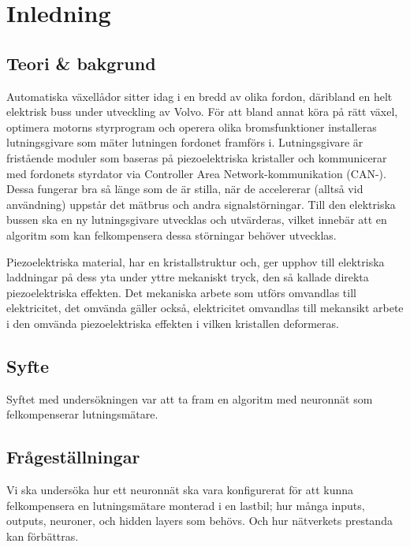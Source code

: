 \section{Inledning}
\subsection{Teori \& bakgrund}

Automatiska växellådor sitter idag i en bredd av olika fordon, däribland en
helt elektrisk buss under utveckling av Volvo.
För att bland annat köra på rätt växel, optimera motorns styrprogram och operera
olika bromsfunktioner %
installeras lutningsgivare som mäter lutningen fordonet framförs i.
Lutningsgivare är fristående moduler som baseras på piezoelektriska
kristaller och kommunicerar med fordonets styrdator via Controller
Area Network-kommunikation (CAN-).
Dessa fungerar bra så länge som de är stilla, när de accelererar (alltså vid
användning)  uppstår det mätbrus och andra signalstörningar.
Till den elektriska bussen ska en ny lutningsgivare utvecklas och utvärderas,
vilket innebär att en algoritm som kan felkompensera dessa störningar behöver
utvecklas.


Piezoelektriska material, har en kristallstruktur och, ger upphov till
elektriska laddningar på dess yta under yttre mekaniskt tryck, den så kallade
direkta piezoelektriska effekten.
Det mekaniska arbete som utförs omvandlas till elektricitet, det omvända gäller
också, elektricitet omvandlas till mekansikt arbete i den omvända
piezoelektriska effekten i vilken kristallen deformeras.
\autocite{electronicdesign2016}

\subsection{Syfte}
Syftet med  undersökningen var att ta fram en algoritm med neuronnät som
felkompenserar lutningsmätare.

\subsection{Frågeställningar}
Vi ska undersöka hur ett neuronnät ska vara konfigurerat för att kunna
felkompensera en lutningsmätare monterad i en lastbil; hur många inputs,
outputs, neuroner, och hidden layers som behövs.
Och hur nätverkets prestanda kan förbättras.
